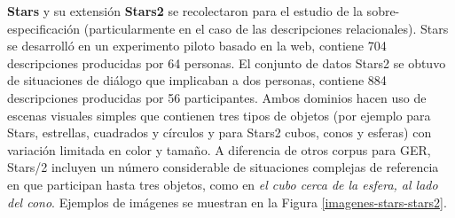 \label{sec:corpusSTARS}
{\bf Stars} \cite{stars-mutual-disamb} y su extensi\'on {\bf Stars2} se recolectaron para el estudio de la sobre-especificaci\'on (particularmente en el caso de las descripciones relacionales). Stars se desarroll\'o en un experimento piloto basado en la web, contiene 704 descripciones producidas por 64 personas. El conjunto de datos Stars2 se obtuvo de situaciones de di\'alogo que implicaban a dos personas, contiene 884 descripciones producidas por 56 participantes. Ambos dominios hacen uso de escenas visuales simples que contienen tres tipos de objetos (por ejemplo para Stars, estrellas, cuadrados y c\'irculos y para Stars2 cubos, conos y esferas) con variaci\'on limitada en color y tama\~no. A diferencia de otros corpus para GER, Stars/2 incluyen un n\'umero considerable de situaciones complejas de referencia en que participan hasta tres objetos, como en {\it el cubo cerca de la esfera, al lado del cono}. Ejemplos de im\'agenes se muestran en la Figura \ref{imagenes-stars-stars2}.

